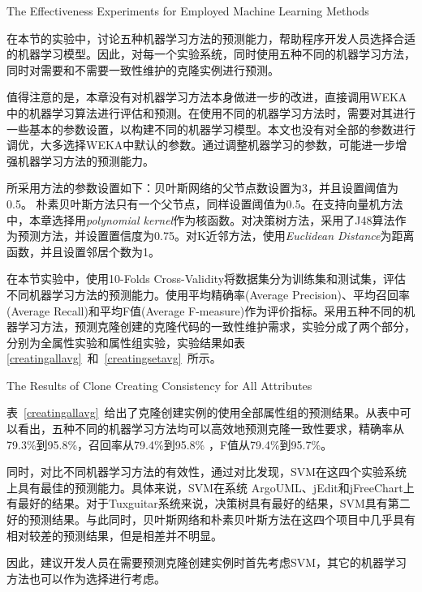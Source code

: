{The Effectiveness Experiments for Employed Machine Learning Methods}

在本节的实验中，讨论五种机器学习方法的预测能力，帮助程序开发人员选择合适的机器学习模型。因此，对每一个实验系统，同时使用五种不同的机器学习方法，同时对需要和不需要一致性维护的克隆实例进行预测。

值得注意的是，本章没有对机器学习方法本身做进一步的改进，直接调用WEKA中的机器学习算法进行评估和预测。在使用不同的机器学习方法时，需要对其进行一些基本的参数设置，以构建不同的机器学习模型。本文也没有对全部的参数进行调优，大多选择WEKA中默认的参数。通过调整机器学习的参数，可能进一步增强机器学习方法的预测能力。

所采用方法的参数设置如下：贝叶斯网络的父节点数设置为3，并且设置阈值为0.5。 朴素贝叶斯方法只有一个父节点，同样设置阈值为0.5。在支持向量机方法中，本章选择用{\em polynomial kernel\/}作为核函数。对决策树方法，采用了J48算法作为预测方法，并设置置信度为0.75。对K近邻方法，使用{\em Euclidean Distance\/}为距离函数，并且设置邻居个数为1。

在本节实验中，使用10-Folds Cross-Validity将数据集分为训练集和测试集，评估不同机器学习方法的预测能力。使用平均精确率(Average Precision)、平均召回率(Average Recall)和平均F值(Average F-measure)作为评价指标。采用五种不同的机器学习方法，预测克隆创建的克隆代码的一致性维护需求，实验分成了两个部分，分别为全属性实验和属性组实验，实验结果如表\ref{creatingallavg}~和~\ref{creatingsetavg}~所示。

{The Results of Clone Creating Consistency for All Attributes}

表~\ref{creatingallavg}~给出了克隆创建实例的使用全部属性组的预测结果。从表中可以看出，五种不同的机器学习方法均可以高效地预测克隆一致性要求，精确率从79.3\%到95.8\%，召回率从79.4\%到95.8\% ，F值从79.4\%到95.7\%。

同时，对比不同机器学习方法的有效性，通过对比发现，SVM在这四个实验系统上具有最佳的预测能力。具体来说，SVM在系统 ArgoUML、jEdit和jFreeChart上有最好的结果。对于{Tuxguitar}系统来说，决策树具有最好的结果，SVM具有第二好的预测结果。与此同时，贝叶斯网络和朴素贝叶斯方法在这四个项目中几乎具有相对较差的预测结果，但是相差并不明显。

因此，建议开发人员在需要预测克隆创建实例时首先考虑SVM，其它的机器学习方法也可以作为选择进行考虑。

